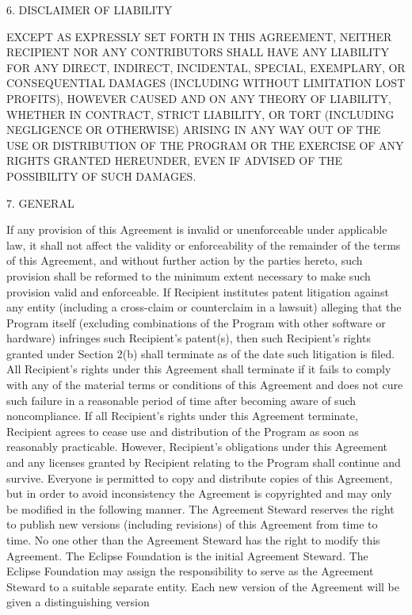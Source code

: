 6. DISCLAIMER OF LIABILITY

EXCEPT AS EXPRESSLY SET FORTH IN THIS AGREEMENT, NEITHER RECIPIENT
NOR ANY CONTRIBUTORS SHALL HAVE ANY LIABILITY FOR ANY DIRECT,
INDIRECT, INCIDENTAL, SPECIAL, EXEMPLARY, OR CONSEQUENTIAL DAMAGES
(INCLUDING WITHOUT LIMITATION LOST PROFITS), HOWEVER CAUSED AND
ON ANY THEORY OF LIABILITY, WHETHER IN CONTRACT, STRICT LIABILITY,
OR TORT (INCLUDING NEGLIGENCE OR OTHERWISE) ARISING IN ANY WAY
OUT OF THE USE OR DISTRIBUTION OF THE PROGRAM OR THE EXERCISE
OF ANY RIGHTS GRANTED HEREUNDER, EVEN IF ADVISED OF THE POSSIBILITY
OF SUCH DAMAGES.


7. GENERAL

If any provision of this Agreement is invalid or unenforceable
under applicable law, it shall not affect the validity or enforceability
of the remainder of the terms of this Agreement, and without
further action by the parties hereto, such provision shall be
reformed to the minimum extent necessary to make such provision
valid and enforceable.
If Recipient institutes patent litigation against any entity
(including a cross-claim or counterclaim in a lawsuit) alleging
that the Program itself (excluding combinations of the Program
with other software or hardware) infringes such Recipient's patent(s),
then such Recipient's rights granted under Section 2(b) shall
terminate as of the date such litigation is filed.
All Recipient's rights under this Agreement shall terminate if
it fails to comply with any of the material terms or conditions
of this Agreement and does not cure such failure in a reasonable
period of time after becoming aware of such noncompliance. If
all Recipient's rights under this Agreement terminate, Recipient
agrees to cease use and distribution of the Program as soon as
reasonably practicable. However, Recipient's obligations under
this Agreement and any licenses granted by Recipient relating
to the Program shall continue and survive.
Everyone is permitted to copy and distribute copies of this Agreement,
but in order to avoid inconsistency the Agreement is copyrighted
and may only be modified in the following manner. The Agreement
Steward reserves the right to publish new versions (including
revisions) of this Agreement from time to time. No one other
than the Agreement Steward has the right to modify this Agreement.
The Eclipse Foundation is the initial Agreement Steward. The
Eclipse Foundation may assign the responsibility to serve as
the Agreement Steward to a suitable separate entity. Each new
version of the Agreement will be given a distinguishing version
